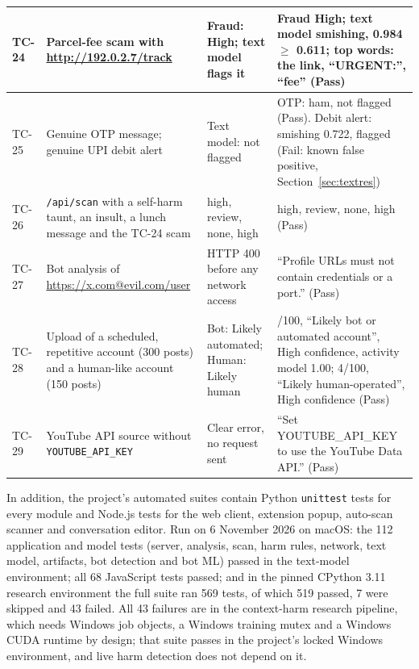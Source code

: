 \begin{footnotesize}
\begin{longtable}{|l|>{\raggedright\arraybackslash}p{4.6cm}|>{\raggedright\arraybackslash}p{4.3cm}|>{\raggedright\arraybackslash}p{4.4cm}|}
TC-24 & Parcel-fee scam with \url{http://192.0.2.7/track} & Fraud: High; text model flags it & Fraud High; text model smishing, 0.984 $\ge$ 0.611; top words: the link, ``URGENT:'', ``fee'' (Pass) \\ \hline
TC-25 & Genuine OTP message; genuine UPI debit alert & Text model: not flagged & OTP: ham, not flagged (Pass). Debit alert: smishing 0.722, flagged (Fail: known false positive, Section~\ref{sec:textres}) \\ \hline
TC-26 & \texttt{/api/scan} with a self-harm taunt, an insult, a lunch message and the TC-24 scam & high, review, none, high & high, review, none, high (Pass) \\ \hline
TC-27 & Bot analysis of \url{https://x.com@evil.com/user} & HTTP 400 before any network access & 400 ``Profile URLs must not contain credentials or a port.'' (Pass) \\ \hline
TC-28 & Upload of a scheduled, repetitive account (300 posts) and a human-like account (150 posts) & Bot: Likely automated; Human: Likely human & 82/100, ``Likely bot or automated account'', High confidence, activity model 1.00; 4/100, ``Likely human-operated'', High confidence (Pass) \\ \hline
TC-29 & YouTube API source without \texttt{YOUTUBE\_API\_KEY} & Clear error, no request sent & 400 ``Set YOUTUBE\_API\_KEY to use the YouTube Data API.'' (Pass) \\ \hline
\end{longtable}
\end{footnotesize}

\noindent In addition, the project's automated suites contain Python \texttt{unittest} tests for every module and Node.js tests for the web client, extension popup, auto-scan scanner and conversation editor. Run on 6 November 2026 on macOS: the 112 application and model tests (server, analysis, scan, harm rules, network, text model, artifacts, bot detection and bot ML) passed in the text-model environment; all 68 JavaScript tests passed; and in the pinned CPython 3.11 research environment the full suite ran 569 tests, of which 519 passed, 7 were skipped and 43 failed. All 43 failures are in the context-harm research pipeline, which needs Windows job objects, a Windows training mutex and a Windows CUDA runtime by design; that suite passes in the project's locked Windows environment, and live harm detection does not depend on it.

